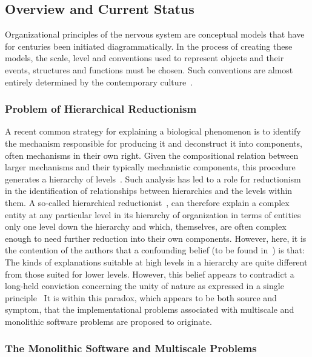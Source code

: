 \documentclass[10pt,letterpaper]{article}
\begin{document}
\subsection*{Overview and Current Status}

Organizational principles of the nervous system are conceptual models that have for centuries been initiated diagrammatically. In the process of creating these models, the scale, level and conventions used to represent objects and their events, structures and functions must be chosen. Such conventions are almost entirely determined by the contemporary culture~\cite{jacobson93,sperry80}.

\subsubsection*{Problem of Hierarchical Reductionism}
A recent common strategy for explaining a biological phenomenon is to identify the mechanism responsible for producing it and deconstruct it into components, often mechanisms in their own right. Given the compositional relation between larger mechanisms and their typically mechanistic components, this procedure generates a hierarchy of levels~\cite{bechtel22}. Such analysis has led to a role for reductionism in the identification of relationships between hierarchies and the levels within them. A so-called hierarchical reductionist~\cite{dawkins06}, can therefore explain a complex entity at any particular level in its hierarchy of organization in terms of entities only one level down the hierarchy and which, themselves, are often complex enough to need further reduction into their own components. However, here, it is the contention of the authors that a confounding belief (to be found in~\cite{dawkins06}) is that: The kinds of explanations suitable at high levels in a hierarchy are quite different from those suited for lower levels. However, this belief appears to contradict a long-held conviction concerning the unity of nature as expressed in a single principle~\cite{whyte49} It is within this paradox, which appears to be both source and symptom, that the implementational problems associated with multiscale and monolithic software problems are proposed to originate.  

\subsubsection*{The Monolithic Software and Multiscale Problems}
\end{document}
